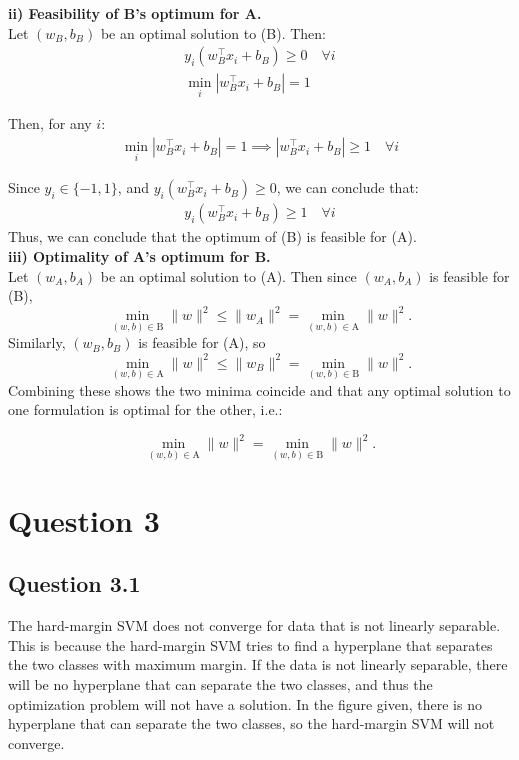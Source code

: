 \documentclass[a4paper]{article}
\begin{document}
\vspace{2ex}
\noindent\textbf{ii) Feasibility of B's optimum for A.}\\

\noindent Let \((w_B,b_B)\) be an optimal solution to (B). Then:
\begin{align*}
    y_i\left(w_B^\top x_i + b_B\right) \ge 0 \quad\forall i \\
    \min_i  |w_B^\top x_i + b_B| = 1
\end{align*}

\noindent Then, for any \(i\):
\begin{align*}
    \min_i  |w_B^\top x_i + b_B| = 1 \implies |w_B^\top x_i + b_B| \ge 1 \quad\forall i
\end{align*}

\noindent Since \(y_i \in \{-1, 1\}\), and $y_i\left(w_B^\top x_i + b_B\right) \ge 0$, we can conclude that:
\begin{align*}
    y_i\left(w_B^\top x_i + b_B\right) \ge 1 \quad\forall i
\end{align*}
\noindent Thus, we can conclude that the optimum of (B) is feasible for (A).\\

\vspace{2ex}
\noindent\textbf{iii) Optimality of A's optimum for B.}\\

\noindent Let $(w_A,b_A)$ be an optimal solution to (A). Then since \((w_A,b_A)\) is feasible for (B),
\[
    \min_{(w,b)\in\mathrm{B}}\|w\|^2
     \le \|w_A\|^2
     = 
    \min_{(w,b)\in\mathrm{A}}\|w\|^2.
\]
Similarly, \((w_B,b_B)\) is feasible for (A), so
\[
    \min_{(w,b)\in\mathrm{A}}\|w\|^2
     \le \|w_B\|^2
     = 
    \min_{(w,b)\in\mathrm{B}}\|w\|^2.
\]
Combining these shows the two minima coincide and that any optimal solution to one formulation is optimal for the other, i.e.:

\[
    \min_{(w,b)\in\mathrm{A}}\|w\|^2
     = 
    \min_{(w,b)\in\mathrm{B}}\|w\|^2.
\]


\newpage 
\section*{Question 3}
\subsection*{Question 3.1}
\noindent The hard-margin SVM does not converge for data that is not linearly separable. This is because the hard-margin SVM tries to find a hyperplane that separates the two classes with maximum margin. If the data is not linearly separable, there will be no hyperplane that can separate the two classes, and thus the optimization problem will not have a solution. In the figure given, there is no hyperplane that can separate the two classes, so the hard-margin SVM will not converge.
\end{document}

